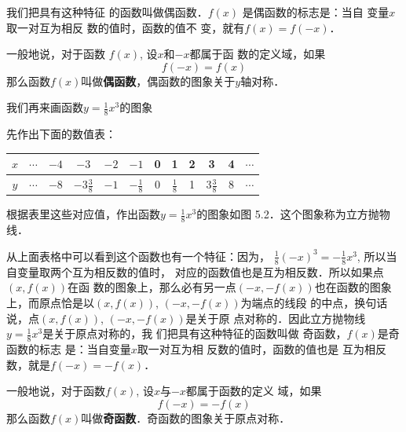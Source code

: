 我们把具有这种特征
的函数叫做偶函数．$f(x)$
是偶函数的标志是：当自
变量$x$取一对互为相反
数的值时，函数的值不
变，就有$f(x)=f(-x)$．

一般地说，对于函数
$f(x)$, 设$x$和$-x$都属于函
数的定义域，如果
\[f(-x)=f(x)\]
那么函数$f(x)$叫做\textbf{偶函数}，偶函数的图象关于$y$轴对称．

我们再来画函数$y=\frac{1}{8}x^3$的图象

先作出下面的数值表：
\begin{center}
\begin{tabular}{c|ccccccccccc}
    \hline
    $x$ &$\cdots$&$-4$&$-3$&$-2$&$-1$&0&1&2&3&4&$\cdots$\\
\hline
$y$ &$\cdots$&$-8$&$-3\tfrac{3}{8}$&$-1$&$-\tfrac{1}{8}$&0&$\tfrac{1}{8}$&1&$3\tfrac{3}{8}$&8&$\cdots$\\
\hline
\end{tabular}
\end{center}

根据表里这些对应值，作出函数$y=\frac{1}{8}x^3$的图象如图
5.2．这个图象称为立方抛物线．
\begin{figure}[htp]
    \centering
{}
    \caption{}
\end{figure}

从上面表格中可以看到这个函数也有一个特征：因为，
$\frac{1}{8}(-x)^3=-\frac{1}{8}x^3$, 所以当自变量取两个互为相反数的值时，
对应的函数值也是互为相反数．所以如果点$(x,f(x))$在函
数的图象上，那么必有另一点$(-x,-f(x))$也在函数的图象
上，而原点恰是以$(x,f(x))$, $(-x,-f(x))$为端点的线段
的中点，换句话说，点$(x,f(x))$, $(-x,-f(x))$是关于原
点对称的．因此立方抛物线
$y=\frac{1}{8}x^3$是关于原点对称的，我
们把具有这种特征的函数叫做
奇函数，$f(x)$是奇函数的标志
是：当自变量$x$取一对互为相
反数的值时，函数的值也是
互为相反数，就是$f(-x)=-f(x)$．

一般地说，对于函数$f(x)$, 设$x$与$-x$都属于函数的定义
域，如果$$f(-x)=-f(x)$$ 那么函数$f(x)$叫做\textbf{奇函数}．奇函数的图象关于原点对称．

